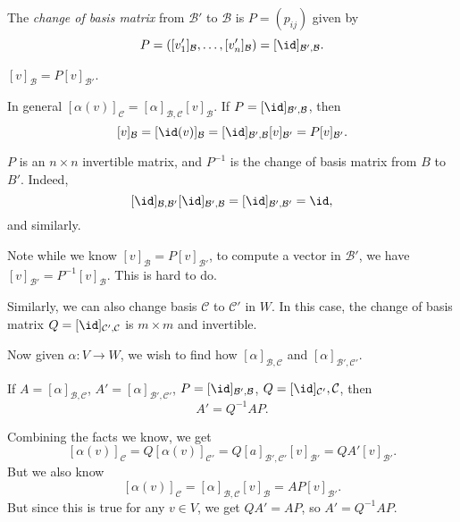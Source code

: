 \documentclass[12pt]{article}
\begin{document}
\begin{definition}
	The \textit{change of basis matrix} from $\mathcal{B}'$ to $\mathcal{B}$ is $P = (p_{ij})$ given by
	\[
		P = ([v_1']_{\mathcal{B}}, \ldots, [v_n']_{\mathcal{B}}) = [\id]_{\mathcal{B}', \mathcal{B}}
	.\]
\end{definition}

\begin{lemma}
	$[v]_{\mathcal{B}} = P[v]_{\mathcal{B}'}$.
\end{lemma}

\begin{proofbox}
	In general $[\alpha(v)]_{\mathcal{C}} = [\alpha]_{\mathcal{B}, \mathcal{C}} [v]_{\mathcal{B}}$. If $P = [\id]_{\mathcal{B}', \mathcal{B}}$, then
	\[
		[v]_{\mathcal{B}} = [\id(v)]_{\mathcal{B}} = [\id]_{\mathcal{B}', \mathcal{B}} [v]_{\mathcal{B}'} = P[v]_{\mathcal{B}'}
	.\]
\end{proofbox}

\begin{remark} 
	$P$ is an $n \times n$ invertible matrix, and $P^{-1}$ is the change of basis matrix from $B$ to $B'$. Indeed,
	\[
		[\id]_{\mathcal{B}, \mathcal{B}'} [\id]_{\mathcal{B}', \mathcal{B}} = [\id]_{\mathcal{B}', \mathcal{B}'} = \id
	,\]
	and similarly.
\end{remark}

Note while we know $[v]_{\mathcal{B}} = P [v]_{\mathcal{B}'}$, to compute a vector in $\mathcal{B}'$, we have $[v]_{\mathcal{B}'} = P^{-1}[v]_{\mathcal{B}}$. This is hard to do.

Similarly, we can also change basis $\mathcal{C}$ to $\mathcal{C}'$ in $W$. In this case, the change of basis matrix $Q = [\id]_{\mathcal{C}', \mathcal{C}}$ is $m \times m$ and invertible.

Now given $\alpha : V \to W$, we wish to find how $[\alpha]_{\mathcal{B}, \mathcal{C}}$ and $[\alpha]_{\mathcal{B}', \mathcal{C}'}$.

\begin{proposition}
	If $A = [\alpha]_{\mathcal{B}, \mathcal{C}}$, $A' = [\alpha]_{\mathcal{B}', \mathcal{C}'}$, $P = [\id]_{\mathcal{B}', \mathcal{B}}$, $Q = [\id]_{\mathcal{C}'}, \mathcal{C}$, then
	\[
	A' = Q^{-1}AP
	.\]
\end{proposition}

\begin{proofbox}
	Combining the facts we know, we get
\[
	[\alpha(v)]_{\mathcal{C}} = Q[\alpha(v)]_{\mathcal{C}'} = Q[a]_{\mathcal{B}', \mathcal{C}'} [v]_{\mathcal{B}'} = Q A' [v]_{\mathcal{B}'}.
\]
But we also know
\[
	[\alpha(v)]_{\mathcal{C}} = [\alpha]_{\mathcal{B}, \mathcal{C}}[v]_{\mathcal{B}} = A P [v]_{\mathcal{B}'}
.\]
But since this is true for any $v \in V$, we get $QA' = AP$, so $A' = Q^{-1}AP$.
\end{proofbox}
\end{document}
